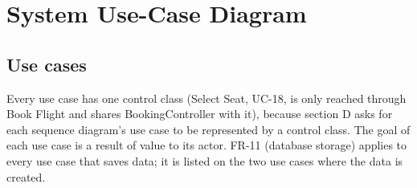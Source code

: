 \section{System Use-Case Diagram}

\subsection*{Use cases}

Every use case has one control class (Select Seat, UC-18, is only reached
through Book Flight and shares BookingController with it), because section D asks for each
sequence diagram's use case to be represented by a control class. The goal of
each use case is a result of value to its actor. FR-11 (database storage)
applies to every use case that saves data; it is listed on the two use cases
where the data is created.


